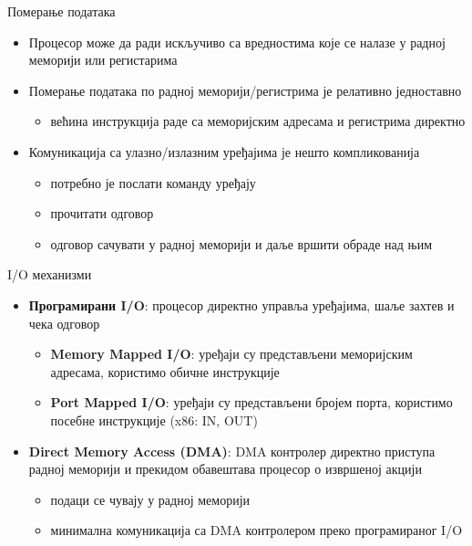\documentclass[xcolor=table]{beamer}
\begin{document}
    \begin{frame}{Померање података}
        \begin{itemize}
            \item Процесор може да ради искључиво са вредностима које се налазе у радној меморији или регистарима
            \item Померање података по радној меморији/регистрима је релативно једноставно
            \begin{itemize}
                \item већина инструкција раде са меморијским адресама и регистрима директно
            \end{itemize}
            \item Комуникација са улазно/излазним уређајима је нешто компликованија
            \begin{itemize}
                \item потребно је послати команду уређају
                \item прочитати одговор
                \item одговор сачувати у радној меморији и даље вршити обраде над њим
            \end{itemize}
        \end{itemize}
    \end{frame}
    
    \begin{frame}{I/O механизми}
        \begin{itemize}
            \item \textbf{Програмирани I/O}: процесор директно управља уређајима, шаље захтев и чека одговор
            \begin{itemize}
                \item \textbf{Memory Mapped I/O}: уређаји су представљени меморијским адресама, користимо обичне инструкције
                \item \textbf{Port Mapped I/O}: уређаји су представљени бројем порта, користимо посебне инструкције (x86: IN, OUT)
            \end{itemize}
            \item \textbf{Direct Memory Access (DMA)}: DMA контролер директно приступа радној меморији и прекидом обавештава процесор о извршеној акцији
            \begin{itemize}
                \item подаци се чувају у радној меморији
                \item минимална комуникација са DMA контролером преко програмираног I/O
            \end{itemize}
        \end{itemize}
    \end{frame}
    
\end{document}
